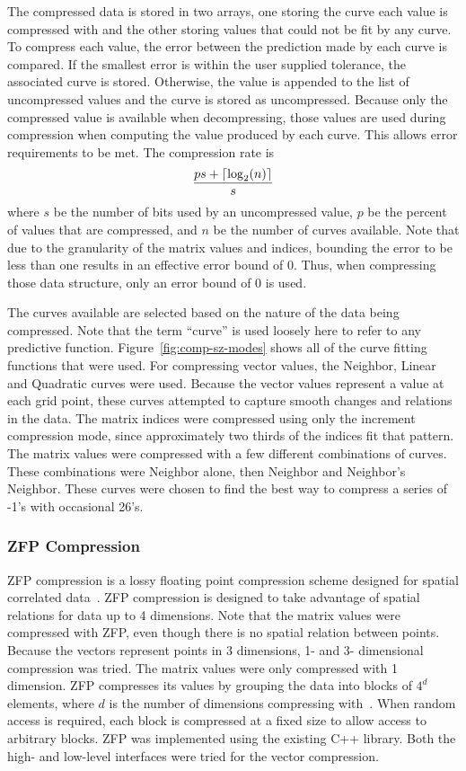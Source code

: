 The compressed data is stored in two arrays, one storing the curve each value is compressed with and the other storing values that could not be fit by any curve.
To compress each value, the error between the prediction made by each curve is compared.
If the smallest error is within the user supplied tolerance, the associated curve is stored.
Otherwise, the value is appended to the list of uncompressed values and the curve is stored as uncompressed.
Because only the compressed value is available when decompressing, those values are used during compression when computing the value produced by each curve.
This allows error requirements to be met.
The compression rate is
\[
	\frac{ps+\lceil\log_2(n)\rceil}{s}
\]
where \(s\) be the number of bits used by an uncompressed value, \(p\) be the percent of values that are compressed, and \(n\) be the number of curves available.
Note that due to the granularity of the matrix values and indices, bounding the error to be less than one results in an effective error bound of 0.
Thus, when compressing those data structure, only an error bound of 0 is used.



The curves available are selected based on the nature of the data being compressed.
Note that the term ``curve'' is used loosely here to refer to any predictive function.
Figure~\ref{fig:comp-sz-modes} shows all of the curve fitting functions that were used.
For compressing vector values, the Neighbor, Linear and Quadratic curves were used.
Because the vector values represent a value at each grid point, these curves attempted to capture smooth changes and relations in the data.
The matrix indices were compressed using only the increment compression mode, since approximately two thirds of the indices fit that pattern.
The matrix values were compressed with a few different combinations of curves.
These combinations were Neighbor alone, then Neighbor and Neighbor's Neighbor.
These curves were chosen to find the best way to compress a series of -1's with occasional 26's.

\subsubsection{ZFP Compression}
ZFP compression is a lossy floating point compression scheme designed for spatial correlated data~\cite{Lindstrom:2014:zfp}.
ZFP compression is designed to take advantage of spatial relations for data up to 4 dimensions.
Note that the matrix values were compressed with ZFP, even though there is no spatial relation between points.
Because the vectors represent points in 3 dimensions, 1- and 3- dimensional compression was tried.
The matrix values were only compressed with 1 dimension.
ZFP compresses its values by grouping the data into blocks of \(4^d\) elements, where \(d\) is the number of dimensions compressing with~\cite{Lindstrom:2014:zfp}.
When random access is required, each block is compressed at a fixed size to allow access to arbitrary blocks.
ZFP was implemented using the existing C++ library.
Both the high- and low-level interfaces were tried for the vector compression.


